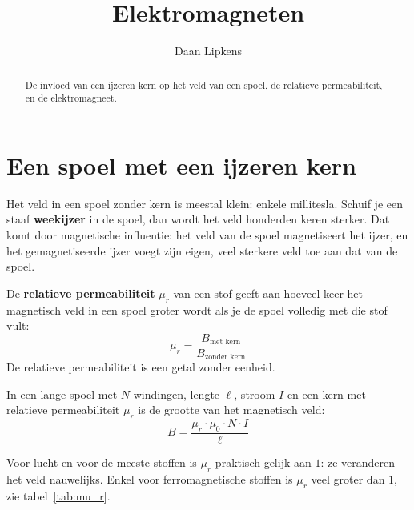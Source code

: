 \documentclass{ximera}
\title{Elektromagneten}
\author{Daan Lipkens}
\begin{document}
\begin{abstract}
    De invloed van een ijzeren kern op het veld van een spoel, de relatieve permeabiliteit, en de elektromagneet.
\end{abstract}
\maketitle
\label{ond:magnetisme_elektromagneet}

\section{Een spoel met een ijzeren kern}\label{sec:elektromagneet}
Het veld in een spoel zonder kern is meestal klein: enkele millitesla. Schuif je een staaf \textbf{weekijzer} in de spoel, dan wordt het veld honderden keren sterker. Dat komt door magnetische influentie: het veld van de spoel magnetiseert het ijzer, en het gemagnetiseerde ijzer voegt zijn eigen, veel sterkere veld toe aan dat van de spoel.

\begin{definition}[foldable=true,title={Relatieve permeabiliteit}]\nl
    De \textbf{relatieve permeabiliteit} $\mu_r$ van een stof geeft aan hoeveel keer het magnetisch veld in een spoel groter wordt als je de spoel volledig met die stof vult:
    \begin{equation*}
        \mu_r = \frac{B_{\text{met kern}}}{B_{\text{zonder kern}}}
    \end{equation*}
    De relatieve permeabiliteit is een getal zonder eenheid.
\end{definition}

\begin{proposition}[foldable=true,title={Magnetisch veld in een spoel met kern}]\nl
    In een lange spoel met $N$ windingen, lengte $\ell$, stroom $I$ en een kern met relatieve permeabiliteit $\mu_r$ is de grootte van het magnetisch veld:
    \begin{equation}\label{eq:B_spoel_kern}
        B = \frac{\mu_r \cdot \mu_0 \cdot N \cdot I}{\ell}
    \end{equation}
\end{proposition}

Voor lucht en voor de meeste stoffen is $\mu_r$ praktisch gelijk aan $1$: ze veranderen het veld nauwelijks. Enkel voor ferromagnetische stoffen is $\mu_r$ veel groter dan $1$, zie tabel~\ref{tab:mu_r}.
\end{document}
